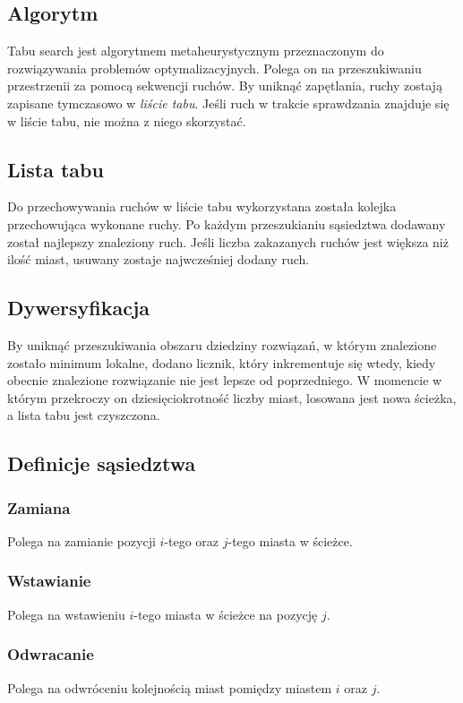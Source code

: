 \documentclass{article}
\begin{document}
\subsection{Algorytm}
Tabu search jest algorytmem metaheurystycznym przeznaczonym do rozwiązywania problemów optymalizacyjnych. Polega on na przeszukiwaniu przestrzenii za pomocą sekwencji ruchów. By uniknąć zapętlania, ruchy zostają zapisane tymczasowo w \textit{liście tabu}. Jeśli ruch w trakcie sprawdzania znajduje się w liście tabu, nie można z niego skorzystać. 

\subsection{Lista tabu}
Do przechowywania ruchów w liście tabu wykorzystana została kolejka przechowująca wykonane ruchy. Po każdym przeszukianiu sąsiedztwa dodawany został najlepszy znaleziony ruch. Jeśli liczba zakazanych ruchów jest większa niż ilość miast, usuwany zostaje najwcześniej dodany ruch.

\subsection{Dywersyfikacja}
By uniknąć przeszukiwania obszaru dziedziny rozwiązań, w którym znalezione zostało minimum lokalne, dodano licznik, który inkrementuje się wtedy, kiedy obecnie znalezione rozwiązanie nie jest lepsze od poprzedniego. W momencie w którym przekroczy on dziesięciokrotność liczby miast, losowana jest nowa ścieżka, a lista tabu jest czyszczona.



\subsection{Definicje sąsiedztwa}

\subsubsection{Zamiana}
Polega na zamianie pozycji $i$-tego oraz $j$-tego miasta w ścieżce.
\subsubsection{Wstawianie}
Polega na wstawieniu $i$-tego miasta w ścieżce na pozycję $j$.
\subsubsection{Odwracanie}
Polega na odwróceniu kolejnością miast pomiędzy miastem $i$ oraz $j$.
\end{document}
